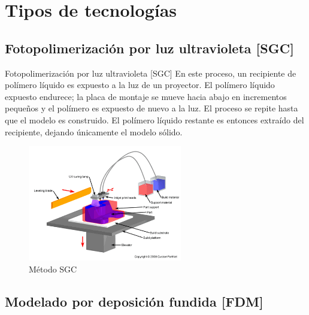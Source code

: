 \documentclass{beamer}
\begin{document}
\section[Tecnologías]{Tipos de tecnologías}


\subsection{Fotopolimerización por luz ultravioleta [SGC]}

\begin{frame}
   
   \begin{block}{Fotopolimerización por luz ultravioleta [SGC]}
   	En este proceso, un recipiente de polímero líquido es expuesto a la luz de un proyector. El polímero líquido expuesto endurece; la placa de montaje se mueve hacia abajo en incrementos pequeños y el polímero es expuesto de nuevo a la luz. El proceso se repite hasta que el modelo es construido. El polímero líquido restante es entonces extraído del recipiente, dejando únicamente el modelo sólido. 
   \end{block}
   
\end{frame} 


\begin{frame}

\begin{figure}[h!]
	\centering
	\includegraphics[width=0.6\textwidth]{SGC.png}
	\caption{Método SGC}
	\label{SGCdiagrama}
\end{figure}	

\end{frame}


\subsection{Modelado por deposición fundida [FDM]}
\end{document}
